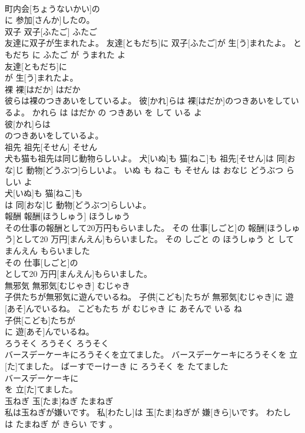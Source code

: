 \documentclass[8pt]{extreport}
\begin{document}
\begin{CJK}{UTF8}{min}
\\	町内会[ちょうないかい]の
\\	に 参加[さんか]したの。			
\\	双子	双子[ふたご]	ふたご	
\\	友達に双子が生まれたよ。	友達[ともだち]に 双子[ふたご]が 生[う]まれたよ。	ともだち に ふたご が うまれた よ	
\\	友達[ともだち]に
\\	が 生[う]まれたよ。			
\\	裸	裸[はだか]	はだか	
\\	彼らは裸のつきあいをしているよ。	彼[かれ]らは 裸[はだか]のつきあいをしているよ。	かれら は はだか の つきあい を して いる よ	
\\	彼[かれ]らは
\\	のつきあいをしているよ。			
\\	祖先	祖先[そせん]	そせん	
\\	犬も猫も祖先は同じ動物らしいよ。	犬[いぬ]も 猫[ねこ]も 祖先[そせん]は 同[おな]じ 動物[どうぶつ]らしいよ。	いぬ も ねこ も そせん は おなじ どうぶつ らしい よ	
\\	犬[いぬ]も 猫[ねこ]も
\\	は 同[おな]じ 動物[どうぶつ]らしいよ。			
\\	報酬	報酬[ほうしゅう]	ほうしゅう	
\\	その仕事の報酬として20万円もらいました。	その 仕事[しごと]の 報酬[ほうしゅう]として20 万円[まんえん]もらいました。	その しごと の ほうしゅう と して 
\\	まんえん もらいました	
\\	その 仕事[しごと]の
\\	として20 万円[まんえん]もらいました。			
\\	無邪気	無邪気[むじゃき]	むじゃき	
\\	子供たちが無邪気に遊んでいるね。	子供[こども]たちが 無邪気[むじゃき]に 遊[あそ]んでいるね。	こどもたち が むじゃき に あそんで いる ね	
\\	子供[こども]たちが
\\	に 遊[あそ]んでいるね。			
\\	ろうそく	ろうそく	ろうそく	
\\	バースデーケーキにろうそくを立てました。	バースデーケーキにろうそくを 立[た]てました。	ばーすでーけーき に ろうそく を たてました	
\\	バースデーケーキに
\\	を 立[た]てました。			
\\	玉ねぎ	玉[たま]ねぎ	たまねぎ	
\\	私は玉ねぎが嫌いです。	私[わたし]は 玉[たま]ねぎが 嫌[きら]いです。	わたし は たまねぎ が きらい です 。	

\end{CJK}
\end{document}
